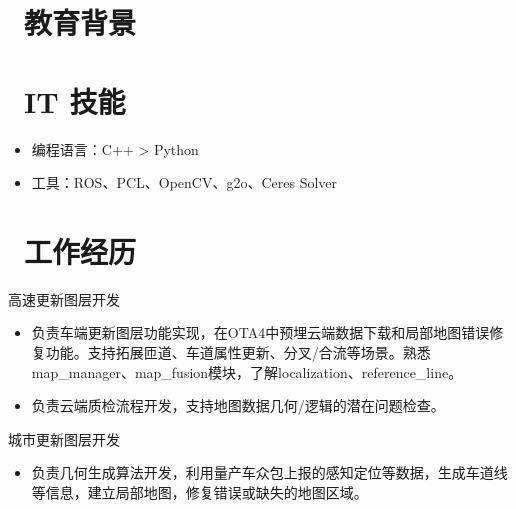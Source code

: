 \documentclass{resume}
\begin{document}



\section{\faGraduationCap\  教育背景}

\section{\faCogs\ IT 技能}
\begin{itemize}[parsep=0.5ex]
  \item 编程语言：C++ > Python
  \item 工具：ROS、PCL、OpenCV、g2o、Ceres Solver
\end{itemize}

\section{\faUsers\ 工作经历}
\begin{onehalfspacing}
  高速更新图层开发
  \begin{itemize}
    \item {负责车端更新图层功能实现，在OTA4中预埋云端数据下载和局部地图错误修复功能。支持拓展匝道、车道属性更新、分叉/合流等场景。熟悉map\_manager、map\_fusion模块，了解localization、reference\_line。}
    \item 负责云端质检流程开发，支持地图数据几何/逻辑的潜在问题检查。
  \end{itemize}

  城市更新图层开发
  \begin{itemize}
    \item 负责几何生成算法开发，利用量产车众包上报的感知定位等数据，生成车道线等信息，建立局部地图，修复错误或缺失的地图区域。
  \end{itemize}
\end{onehalfspacing}
\end{document}
